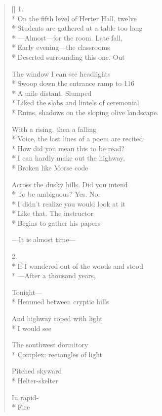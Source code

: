 \label{ch:evening_class}
\settowidth{\versewidth}{On the far side of the bridge, approaching Northampton,}
\begin{verse}[\versewidth]
1.\\*
On the fifth level of Herter Hall, twelve\\*
Students are gathered at a table too long\\*
---Almost---for the room.  Late fall,\\*
Early evening---the classrooms \\*
Deserted surrounding this one.  \qquad Out

The window I can see headlights\\*
Swoop down the entrance ramp to 116\\*
A mile distant.   Slumped\\*
Liked the slabs and lintels of ceremonial\\*
Ruins, shadows on the sloping olive landscape.

With a rising, then a falling \\*
Voice, the last lines of a poem are recited:\\*
How did you mean this to be read?\\*
I can hardly make out the highway,\\*
Broken like Morse code

Across the dusky hills.   Did you intend\\*
To be ambiguous?   Yes.  No.\\*
I didn't realize you would look at it\\*
Like that. \qquad The instructor \\*
Begins to gather his papers

---It is almost time---

2.\\*
If I wandered out of the woods and stood\\*
---After a thousand years, 

Tonight---\\*
Hemmed between cryptic hills

And highway roped with light\\*
I would see

The southwest dormitory\\*
Complex: rectangles of light 

Pitched skyward \\*
Helter-skelter 

In rapid-\\*
Fire 


\end{verse}
